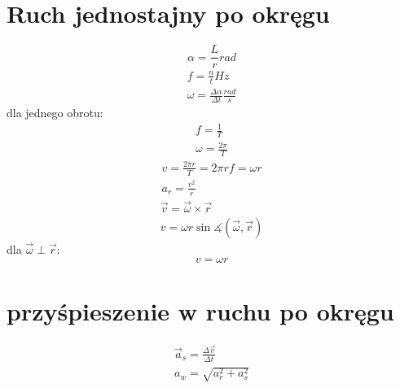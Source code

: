     \section{Ruch jednostajny po okręgu}
      \begin{equation}
        \alpha = \frac Lr \unit{rad}
      \end{equation}
      \begin{gather}
        f = \frac nt \unit{Hz}\\
        \omega = \frac{\Delta\alpha}{\Delta t} \unit{\frac{rad}{s}}
      \end{gather}
      dla jednego obrotu:
      \begin{gather}
        f = \frac 1T\\
        \omega = \frac{2\pi}{T}
      \end{gather}
      \begin{gather}
        v = \frac{2\pi r}{T} = 2\pi rf = \omega r\\
        a_r = \frac{v^2}{r}
      \end{gather}
      \begin{gather}
        \vec v = \vec\omega \times \vec r\\
        v = \omega r\sin\measuredangle(\vec\omega, \vec r)
      \end{gather}
      dla $\vec\omega \perp \vec r$:
      \begin{equation}
        v = \omega r
      \end{equation}
    \section{przyśpieszenie w ruchu po okręgu}
      \begin{gather}
        \vec a_s = \frac{\Delta\vec v}{\Delta t}\\
        a_w = \sqrt{a_r^2 + a_s^2}
      \end{gather}
